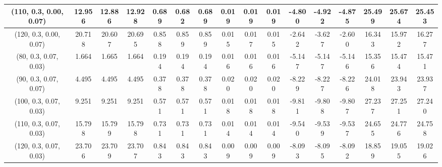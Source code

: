 \documentclass[preprint,12pt,1p]{elsarticle}
\begin{document}
\begin{table}[!h]
\begin{center}
{\begin{tabular}{| c | c | c | c | c | c | c| c| c| c| c| c| c| c| c| c|}
(110, 0.3, 0.00, 0.07)&  12.956 & 12.886 & 12.928 & 0.689 & 0.682 & 0.689 & 0.019 & 0.019 & 0.019 & -4.800 & -4.922 & -4.875 & 25.499 & 25.674& 25.453 \\ \hline
(120, 0.3, 0.00, 0.07)&  20.718 & 20.607 & 20.695 & 0.858 & 0.859 & 0.859 & 0.015 & 0.017 & 0.015 & -2.642 & -3.627 & -2.600 & 16.343 & 15.972 & 16.277 \\ \hline
(80, 0.3, 0.07, 0.03)&  1.664 & 1.665 & 1.664 & 0.194 & 0.194 & 0.194 & 0.016 & 0.016 & 0.016 & -5.147 & -5.147 & -5.146 & 15.356 & 15.474 & 15.471 \\ \hline    
(90, 0.3, 0.07, 0.07)&  4.495 & 4.495 & 4.495 & 0.378 & 0.378 & 0.378 & 0.020 & 0.020 & 0.020 & -8.229 & -8.227 & -8.226 & 24.018 & 23.943 & 23.937 \\ \hline    
(100, 0.3, 0.07, 0.03)&  9.251 & 9.251 & 9.251 & 0.571 & 0.571 & 0.571 & 0.018 & 0.018 & 0.018 & -9.811 & -9.808 & -9.807 & 27.237 & 27.251 & 27.240 \\ \hline    
(110, 0.3, 0.07, 0.03)& 15.798 & 15.799 & 15.798 & 0.731 & 0.731 & 0.731 & 0.014 & 0.014 & 0.014 & -9.540 & -9.539 & -9.537 & 24.655 & 24.776 & 24.758  \\ \hline
(120, 0.3, 0.07, 0.03)&  23.706 & 23.709 & 23.707 & 0.843 & 0.843 & 0.843 & 0.009 & 0.009 & 0.009 & -8.093 & -8.095 & -8.092 & 18.859 & 19.055 & 19.026 \\ \hline
\end{tabular}}
\end{center}
\end{table}

\clearpage
\end{document}
